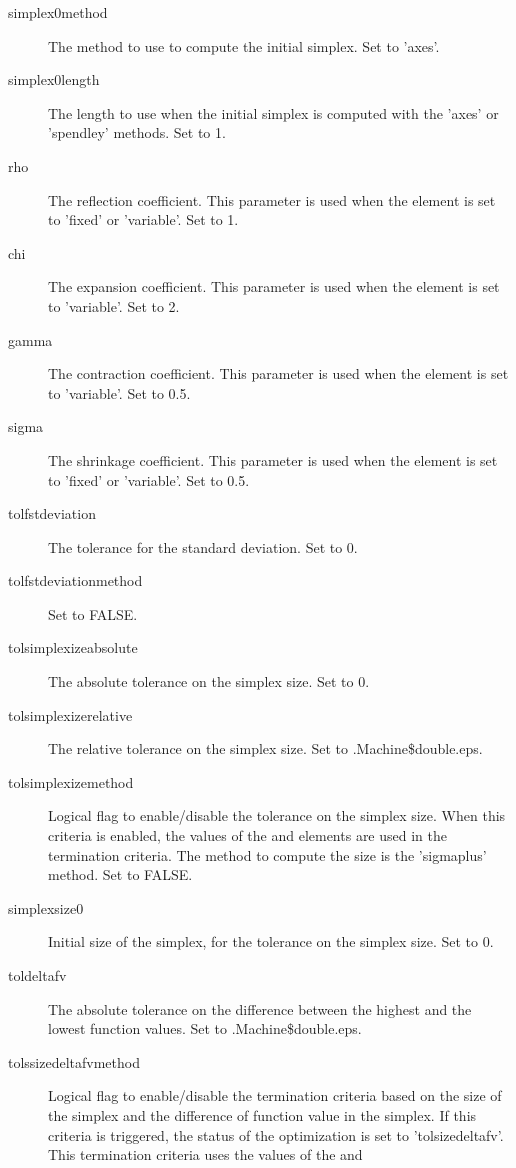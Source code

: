 \begin{Value}
\begin{description}
\begin{description}
\end{description}


\item[simplex0method] The method to use to compute the initial simplex. Set
to 'axes'.
\item[simplex0length] The length to use when the initial simplex is computed
with the 'axes' or 'spendley' methods. Set to 1.
\item[rho] The reflection coefficient. This parameter is used when the
 element is set to 'fixed' or 'variable'. Set to 1.
\item[chi] The expansion coefficient. This parameter is used when the
 element is set to 'variable'. Set to 2.
\item[gamma] The contraction coefficient. This parameter is used when the
 element is set to 'variable'. Set to 0.5.
\item[sigma] The shrinkage coefficient. This parameter is used when the
 element is set to 'fixed' or 'variable'. Set to 0.5.
\item[tolfstdeviation] The tolerance for the standard deviation. Set to 0.
\item[tolfstdeviationmethod] Set to FALSE.
\item[tolsimplexizeabsolute] The absolute tolerance on the simplex size. Set
to 0.
\item[tolsimplexizerelative] The relative tolerance on the simplex size. Set
to .Machine\$double.eps.
\item[tolsimplexizemethod] Logical flag to enable/disable the tolerance on
the simplex size. When this criteria is enabled, the values of the
 and  elements are
used in the termination criteria. The method to compute the size is the
'sigmaplus' method. Set to FALSE.
\item[simplexsize0] Initial size of the simplex, for the tolerance on the
simplex size. Set to 0.
\item[toldeltafv] The absolute tolerance on the difference between the
highest and the lowest function values. Set to .Machine\$double.eps.
\item[tolssizedeltafvmethod] Logical flag to enable/disable the termination
criteria based on the size of the simplex and the difference of function
value in the simplex. If this criteria is triggered, the status of the
optimization is set to 'tolsizedeltafv'. This termination criteria uses
the values of the  and 

\end{description}
\end{Value}
